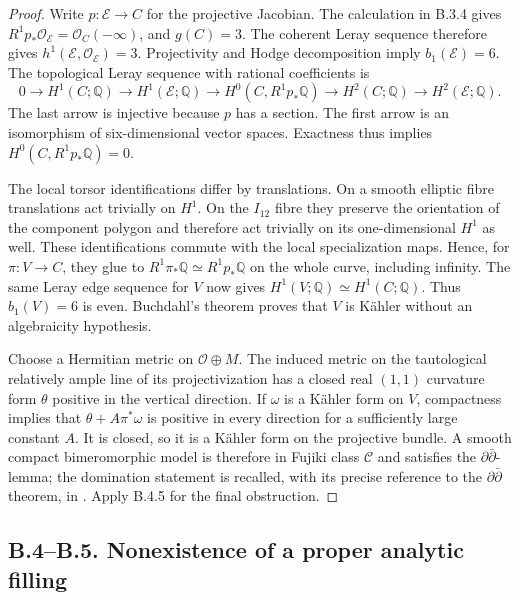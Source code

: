 \begin{proof}
Write $p:\mathscr E\to C$ for the projective Jacobian.
The calculation in B.3.4 gives
$R^1p_*\mathcal O_{\mathscr E}=\mathcal O_C(-\infty)$,
and $g(C)=3$. The coherent Leray sequence therefore gives
$h^1(\mathscr E,\mathcal O_{\mathscr E})=3$. Projectivity
and Hodge decomposition imply $b_1(\mathscr E)=6$.
The topological Leray sequence with rational coefficients is
\[
 0\longrightarrow H^1(C;\mathbb Q)
 \longrightarrow H^1(\mathscr E;\mathbb Q)
 \longrightarrow H^0(C,R^1p_*\mathbb Q)
 \longrightarrow H^2(C;\mathbb Q)
 \longrightarrow H^2(\mathscr E;\mathbb Q).
\]
The last arrow is injective because $p$ has a section.
The first arrow is an isomorphism of six-dimensional
vector spaces. Exactness thus implies
$H^0(C,R^1p_*\mathbb Q)=0$.

The local torsor identifications differ by translations.
On a smooth elliptic fibre translations act trivially on
$H^1$. On the $I_{12}$ fibre they preserve the orientation
of the component polygon and therefore act trivially on
its one-dimensional $H^1$ as well. These identifications
commute with the local specialization maps. Hence, for
$\pi:V\to C$, they glue to
$R^1\pi_*\mathbb Q\simeq R^1p_*\mathbb Q$ on the whole
curve, including infinity. The same Leray edge sequence
for $V$ now gives
$H^1(V;\mathbb Q)\simeq H^1(C;\mathbb Q)$.
Thus $b_1(V)=6$ is even. Buchdahl's theorem
\cite[Theorem 11, p.297]{Buchdahl1999} proves that $V$
is K\"ahler without an algebraicity hypothesis.

Choose a Hermitian metric on $\mathcal O\oplus M$.
The induced metric on the tautological relatively ample
line of its projectivization has a closed real $(1,1)$
curvature form $\theta$ positive in the vertical direction.
If $\omega$ is a K\"ahler form on $V$, compactness implies
that $\theta+A\pi^*\omega$ is positive in every direction
for a sufficiently large constant $A$. It is closed, so
it is a K\"ahler form on the projective bundle. A smooth
compact bimeromorphic model is therefore in Fujiki class
$\mathcal C$ and satisfies the $\partial\bar\partial$-lemma;
the domination statement is recalled, with its precise
reference to the $\partial\bar\partial$ theorem, in
\cite[Section 2.1, p.8]{Chen2026HodgeRoot}. Apply B.4.5
for the final obstruction.
\end{proof}


\subsection{B.4--B.5. Nonexistence of a proper analytic filling}


